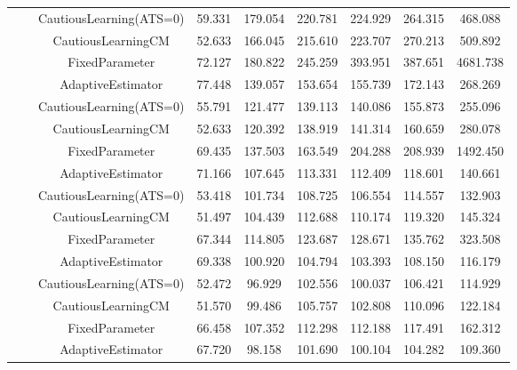 \begin{table}[!h]
\begin{tabular}[t]{ccccccccc}
 &  & CautiousLearning(ATS=0) & 59.331 & 179.054 & 220.781 & 224.929 & 264.315 & 468.088\\

 &  & CautiousLearningCM & 52.633 & 166.045 & 215.610 & 223.707 & 270.213 & 509.892\\

 & \multirow[t]{-4}{*}{\centering\arraybackslash 0.35} & FixedParameter & 72.127 & 180.822 & 245.259 & 393.951 & 387.651 & 4681.738\\
\cmidrule{2-9}
 &  & AdaptiveEstimator & 77.448 & 139.057 & 153.654 & 155.739 & 172.143 & 268.269\\

 &  & CautiousLearning(ATS=0) & 55.791 & 121.477 & 139.113 & 140.086 & 155.873 & 255.096\\

 &  & CautiousLearningCM & 52.633 & 120.392 & 138.919 & 141.314 & 160.659 & 280.078\\

 & \multirow[t]{-4}{*}{\centering\arraybackslash 0.50} & FixedParameter & 69.435 & 137.503 & 163.549 & 204.288 & 208.939 & 1492.450\\
\cmidrule{2-9}
 &  & AdaptiveEstimator & 71.166 & 107.645 & 113.331 & 112.409 & 118.601 & 140.661\\

 &  & CautiousLearning(ATS=0) & 53.418 & 101.734 & 108.725 & 106.554 & 114.557 & 132.903\\

 &  & CautiousLearningCM & 51.497 & 104.439 & 112.688 & 110.174 & 119.320 & 145.324\\

 & \multirow[t]{-4}{*}{\centering\arraybackslash 0.75} & FixedParameter & 67.344 & 114.805 & 123.687 & 128.671 & 135.762 & 323.508\\
\cmidrule{2-9}
 &  & AdaptiveEstimator & 69.338 & 100.920 & 104.794 & 103.393 & 108.150 & 116.179\\

 &  & CautiousLearning(ATS=0) & 52.472 & 96.929 & 102.556 & 100.037 & 106.421 & 114.929\\

 &  & CautiousLearningCM & 51.570 & 99.486 & 105.757 & 102.808 & 110.096 & 122.184\\

 & \multirow[t]{-4}{*}{\centering\arraybackslash 1.00} & FixedParameter & 66.458 & 107.352 & 112.298 & 112.188 & 117.491 & 162.312\\
\cmidrule{2-9}
 &  & AdaptiveEstimator & 67.720 & 98.158 & 101.690 & 100.104 & 104.282 & 109.360\\


\end{tabular}
\end{table}

